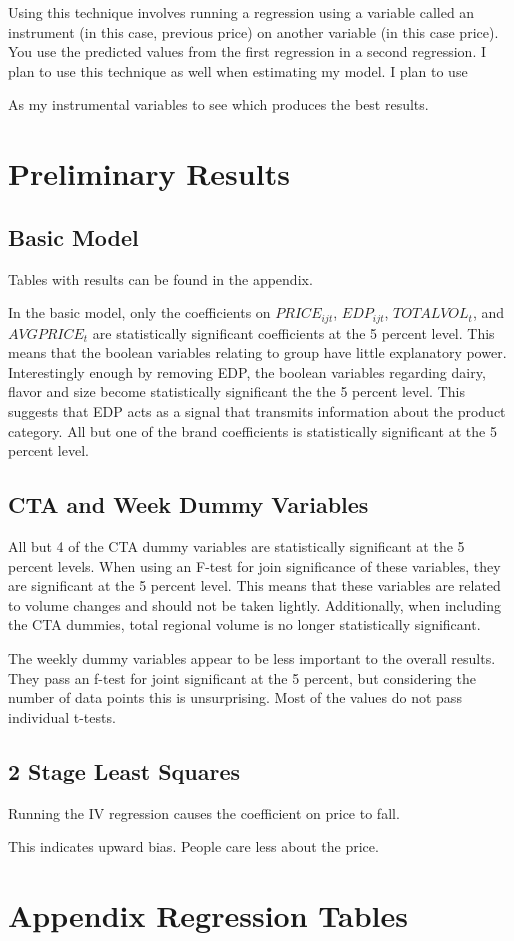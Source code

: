 \documentclass{article}
\begin{document}
Using this technique involves running a regression using a variable called an instrument (in this case, previous price) on another variable (in this case price). You use the predicted values from the first regression in a second regression.  I plan to use this technique as well when estimating my model. I plan to use 


As my instrumental variables to see which produces the best results.

\section{Preliminary Results}

\subsection{Basic Model}

Tables with results can be found in the appendix.

In the basic model, only the coefficients on ${PRICE}_{ijt}$, ${EDP}_{ijt}$, ${TOTALVOL}_t $, and ${AVGPRICE}_{t}$ are statistically significant coefficients at the 5 percent level. This means that the boolean variables relating to group have little explanatory power. Interestingly enough by removing EDP, the boolean variables regarding dairy, flavor and size become statistically significant the the 5 percent level. This suggests that EDP acts as a signal that transmits information about the product category. All but one of the brand coefficients is statistically significant at the 5 percent level.


\subsection{CTA and Week Dummy Variables}

All but 4 of the CTA dummy variables are statistically significant at the 5 percent levels. When using an F-test for join significance of these variables, they are significant at the 5 percent level. This means that these variables are related to volume changes and should not be taken lightly. Additionally, when including the CTA dummies, total regional volume is no longer statistically significant. 

The weekly dummy variables appear to be less important to the overall results. They pass an f-test for joint significant at the 5 percent, but considering the number of data points this is unsurprising. Most of the values do not pass individual t-tests.

\subsection{2 Stage Least Squares}

Running the IV regression causes the coefficient on price to fall.

This indicates upward bias. People care less about the price.


{}


\appendix

\section{Appendix Regression Tables}
\end{document}
